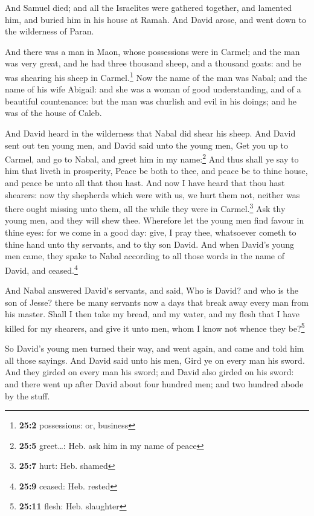  And Samuel died; and all the Israelites were gathered
together, and lamented him, and buried him in his house at Ramah. And
David arose, and went down to the wilderness of Paran.

 And there was a man in Maon, whose possessions were in
Carmel; and the man was very great, and he had three thousand sheep, and
a thousand goats: and he was shearing his sheep in Carmel.\footnote{\textbf{25:2}
  possessions: or, business}  Now the name of the man was
Nabal; and the name of his wife Abigail: and she was a woman of good
understanding, and of a beautiful countenance: but the man was churlish
and evil in his doings; and he was of the house of Caleb.

 And David heard in the wilderness that Nabal did shear
his sheep.  And David sent out ten young men, and David
said unto the young men, Get you up to Carmel, and go to Nabal, and
greet him in my name:\footnote{\textbf{25:5} greet\ldots: Heb. ask him
  in my name of peace}  And thus shall ye say to him that
liveth in prosperity, Peace be both to thee, and peace be to thine
house, and peace be unto all that thou hast.  And now I
have heard that thou hast shearers: now thy shepherds which were with
us, we hurt them not, neither was there ought missing unto them, all the
while they were in Carmel.\footnote{\textbf{25:7} hurt: Heb. shamed}
 Ask thy young men, and they will shew thee. Wherefore let
the young men find favour in thine eyes: for we come in a good day:
give, I pray thee, whatsoever cometh to thine hand unto thy servants,
and to thy son David.  And when David's young men came,
they spake to Nabal according to all those words in the name of David,
and ceased.\footnote{\textbf{25:9} ceased: Heb. rested}

 And Nabal answered David's servants, and said, Who is
David? and who is the son of Jesse? there be many servants now a days
that break away every man from his master.  Shall I then
take my bread, and my water, and my flesh that I have killed for my
shearers, and give it unto men, whom I know not whence they
be?\footnote{\textbf{25:11} flesh: Heb. slaughter}

 So David's young men turned their way, and went again,
and came and told him all those sayings.  And David said
unto his men, Gird ye on every man his sword. And they girded on every
man his sword; and David also girded on his sword: and there went up
after David about four hundred men; and two hundred abode by the stuff.

